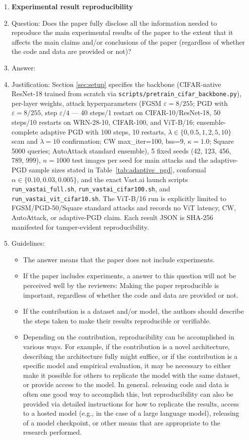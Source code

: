 \begin{enumerate}
    \item {\bf Experimental result reproducibility}
    \item[] Question: Does the paper fully disclose all the information needed to reproduce the main experimental results of the paper to the extent that it affects the main claims and/or conclusions of the paper (regardless of whether the code and data are provided or not)?
    \item[] Answer: \answerYes{}
    \item[] Justification: Section \ref{sec:setup} specifies the backbone (CIFAR-native ResNet-18 trained from scratch via \texttt{scripts/pretrain\_cifar\_backbone.py}), per-layer weights, attack hyperparameters (FGSM $\varepsilon{=}8/255$; PGD with $\varepsilon{=}8/255$, step $\varepsilon/4$ --- 40 steps/1 restart on CIFAR-10/ResNet-18, 50 steps/10 restarts on WRN-28-10, CIFAR-100, and ViT-B/16; ensemble-complete adaptive PGD with 100 steps, 10 restarts, $\lambda \in \{0,0.5,1,2,5,10\}$ scan and $\lambda{=}10$ confirmation; CW max\_iter=100, bss=9, $\kappa{=}1.0$; Square 5000 queries; AutoAttack standard ensemble), 5 fixed seeds (42, 123, 456, 789, 999), $n{=}1000$ test images per seed for main attacks and the adaptive-PGD sample sizes stated in Table~\ref{tab:adaptive_pgd}, conformal $\alpha \in \{0.10, 0.03, 0.005\}$, and the exact Vast.ai launch scripts \texttt{run\_vastai\_full.sh}, \texttt{run\_vastai\_cifar100.sh}, and \texttt{run\_vastai\_vit\_cifar10.sh}. The ViT-B/16 run is explicitly limited to FGSM/PGD-50/Square standard attacks and records no ViT latency, CW, AutoAttack, or adaptive-PGD claim. Each result JSON is SHA-256 manifested for tamper-evident reproducibility.
    \item[] Guidelines:
    \begin{itemize}
        \item The answer \answerNA{} means that the paper does not include experiments.
        \item If the paper includes experiments, a \answerNo{} answer to this question will not be perceived well by the reviewers: Making the paper reproducible is important, regardless of whether the code and data are provided or not.
        \item If the contribution is a dataset and\slash or model, the authors should describe the steps taken to make their results reproducible or verifiable. 
        \item Depending on the contribution, reproducibility can be accomplished in various ways. For example, if the contribution is a novel architecture, describing the architecture fully might suffice, or if the contribution is a specific model and empirical evaluation, it may be necessary to either make it possible for others to replicate the model with the same dataset, or provide access to the model. In general. releasing code and data is often one good way to accomplish this, but reproducibility can also be provided via detailed instructions for how to replicate the results, access to a hosted model (e.g., in the case of a large language model), releasing of a model checkpoint, or other means that are appropriate to the research performed.

\end{itemize}
\end{enumerate}
